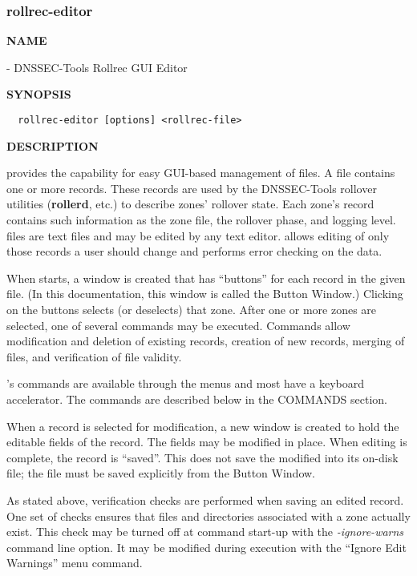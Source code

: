 \clearpage

\subsubsection{rollrec-editor}

{\bf NAME}

 - DNSSEC-Tools Rollrec GUI Editor

{\bf SYNOPSIS}

\begin{verbatim}
  rollrec-editor [options] <rollrec-file>
\end{verbatim}

{\bf DESCRIPTION}

 provides the capability for easy GUI-based management of
 files.  A  file contains one or more
 records.  These records are used by the DNSSEC-Tools rollover
utilities ({\bf rollerd}, etc.) to describe zones' rollover state.  Each
zone's  record contains such information as the zone file, the
rollover phase, and logging level.   files are text files and
may be edited by any text editor.   allows editing of only
those records a user should change and performs error checking on the data.

When  starts, a window is created that has ``buttons'' for
each  record in the given  file.  (In this
documentation, this window is called the Button Window.)  Clicking on the
buttons selects (or deselects) that zone.  After one or more zones are
selected, one of several commands may be executed.  Commands allow
modification and deletion of existing  records, creation of
new  records, merging of  files, and
verification of file validity.

's commands are available through the menus and most have
a keyboard accelerator.  The commands are described below in the COMMANDS
section.

When a  record is selected for modification, a new window is
created to hold the editable fields of the record.  The fields may be modified
in place.  When editing is complete, the record is ``saved''.  This does not
save the modified  into its on-disk file; the file must be
saved explicitly from the Button Window.

As stated above, verification checks are performed when saving an edited
 record.  One set of checks ensures that files and directories
associated with a zone actually exist.  This check may be turned off at
command start-up with the {\it -ignore-warns} command line option.  It may be
modified during execution with the ``Ignore Edit Warnings'' menu command.

